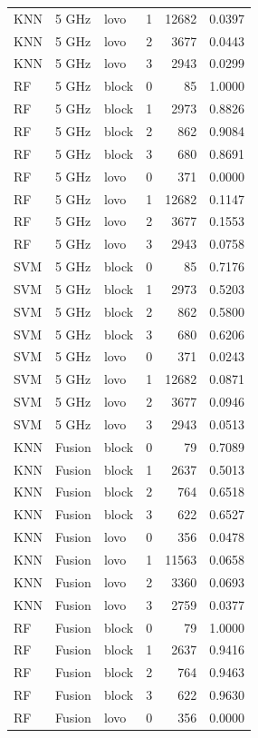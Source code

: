 \begin{tabular}{lllrrr}
KNN & 5 GHz & lovo & 1 & 12682 & 0.0397 \\
KNN & 5 GHz & lovo & 2 & 3677 & 0.0443 \\
KNN & 5 GHz & lovo & 3 & 2943 & 0.0299 \\
RF & 5 GHz & block & 0 & 85 & 1.0000 \\
RF & 5 GHz & block & 1 & 2973 & 0.8826 \\
RF & 5 GHz & block & 2 & 862 & 0.9084 \\
RF & 5 GHz & block & 3 & 680 & 0.8691 \\
RF & 5 GHz & lovo & 0 & 371 & 0.0000 \\
RF & 5 GHz & lovo & 1 & 12682 & 0.1147 \\
RF & 5 GHz & lovo & 2 & 3677 & 0.1553 \\
RF & 5 GHz & lovo & 3 & 2943 & 0.0758 \\
SVM & 5 GHz & block & 0 & 85 & 0.7176 \\
SVM & 5 GHz & block & 1 & 2973 & 0.5203 \\
SVM & 5 GHz & block & 2 & 862 & 0.5800 \\
SVM & 5 GHz & block & 3 & 680 & 0.6206 \\
SVM & 5 GHz & lovo & 0 & 371 & 0.0243 \\
SVM & 5 GHz & lovo & 1 & 12682 & 0.0871 \\
SVM & 5 GHz & lovo & 2 & 3677 & 0.0946 \\
SVM & 5 GHz & lovo & 3 & 2943 & 0.0513 \\
KNN & Fusion & block & 0 & 79 & 0.7089 \\
KNN & Fusion & block & 1 & 2637 & 0.5013 \\
KNN & Fusion & block & 2 & 764 & 0.6518 \\
KNN & Fusion & block & 3 & 622 & 0.6527 \\
KNN & Fusion & lovo & 0 & 356 & 0.0478 \\
KNN & Fusion & lovo & 1 & 11563 & 0.0658 \\
KNN & Fusion & lovo & 2 & 3360 & 0.0693 \\
KNN & Fusion & lovo & 3 & 2759 & 0.0377 \\
RF & Fusion & block & 0 & 79 & 1.0000 \\
RF & Fusion & block & 1 & 2637 & 0.9416 \\
RF & Fusion & block & 2 & 764 & 0.9463 \\
RF & Fusion & block & 3 & 622 & 0.9630 \\
RF & Fusion & lovo & 0 & 356 & 0.0000 \\

\end{tabular}
